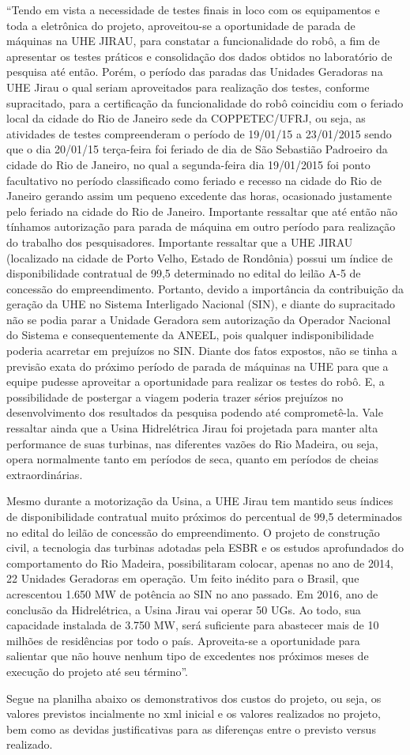 “Tendo em vista a necessidade de testes finais in loco com os equipamentos e
toda a eletrônica do projeto, aproveitou-se a oportunidade de parada de máquinas
na UHE JIRAU, para constatar a funcionalidade do robô, a fim de apresentar os
testes práticos e consolidação dos dados obtidos no laboratório de pesquisa até
então.
Porém, o período das paradas das Unidades Geradoras na UHE Jirau o qual
seriam aproveitados para realização dos testes, conforme supracitado, para a
certificação da funcionalidade do robô coincidiu com o feriado local da cidade do
Rio de Janeiro sede da COPPETEC/UFRJ, ou seja, as atividades de testes
compreenderam o período de 19/01/15 a 23/01/2015 sendo que o dia 20/01/15
terça-feira foi feriado de dia de São Sebastião Padroeiro da cidade do Rio de
Janeiro, no qual a segunda-feira dia 19/01/2015 foi ponto facultativo no período
classificado como feriado e recesso na cidade do Rio de Janeiro gerando assim
um pequeno excedente das horas, ocasionado justamente pelo feriado na cidade
do Rio de Janeiro. Importante ressaltar que até então não tínhamos autorização
para parada de máquina em outro período para realização do trabalho dos
pesquisadores.
Importante ressaltar que a UHE JIRAU (localizado na cidade de Porto Velho,
Estado de Rondônia) possui um índice de disponibilidade contratual de 99,5%
determinado no edital do leilão A-5 de concessão do empreendimento. Portanto,
devido a importância da contribuição da geração da UHE no Sistema Interligado
Nacional (SIN), e diante do supracitado não se podia parar a Unidade Geradora
sem autorização da Operador Nacional do Sistema e consequentemente da
ANEEL, pois qualquer indisponibilidade poderia acarretar em prejuízos no SIN.
Diante dos fatos expostos, não se tinha a previsão exata do próximo período de
parada de máquinas na UHE para que a equipe pudesse aproveitar a oportunidade
para realizar os testes do robô. E, a possibilidade de postergar a viagem poderia
trazer sérios prejuízos no desenvolvimento dos resultados da pesquisa podendo
até comprometê-la.
Vale ressaltar ainda que a Usina Hidrelétrica Jirau foi projetada para manter alta
performance de suas turbinas, nas diferentes vazões do Rio Madeira, ou seja,
opera normalmente tanto em períodos de seca, quanto em períodos de cheias
extraordinárias.

Mesmo durante a motorização da Usina, a UHE Jirau tem mantido seus índices
de disponibilidade contratual muito próximos do percentual de 99,5%
determinados no edital do leilão de concessão do empreendimento. O projeto de
construção civil, a tecnologia das turbinas adotadas pela ESBR e os estudos
aprofundados do comportamento do Rio Madeira, possibilitaram colocar, apenas
no ano de 2014, 22 Unidades Geradoras em operação. Um feito inédito para o
Brasil, que acrescentou 1.650 MW de potência ao SIN no ano passado.
Em 2016, ano de conclusão da Hidrelétrica, a Usina Jirau vai operar 50 UGs. Ao
todo, sua capacidade instalada de 3.750 MW, será suficiente para abastecer mais
de 10 milhões de residências por todo o país.
Aproveita-se a oportunidade para salientar que não houve nenhum tipo de
excedentes nos próximos meses de execução do projeto até seu término”.

Segue na planilha abaixo os demonstrativos dos custos do projeto, ou seja, os
valores previstos incialmente no xml inicial e os valores realizados no
projeto, bem como as devidas justificativas para as diferenças entre o previsto versus realizado.



